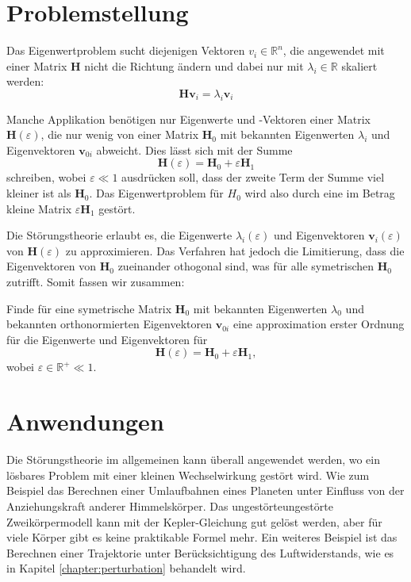 %
%
\section{Problemstellung
\label{ew:section:problemstellung}}

Das Eigenwertproblem sucht diejenigen Vektoren $v_i \in \mathbb{R}^{n} $, die angewendet mit einer Matrix $\bm H$ nicht die Richtung ändern und dabei nur mit $\lambda_i \in \mathbb{R}$ skaliert werden:
\begin{equation}
    \bm H \bm v_i = \lambda_i \bm v_i \label{ew:eq:eig}
\end{equation}

Manche Applikation benötigen nur Eigenwerte und -Vektoren einer Matrix $\bm H(\varepsilon)$, die nur wenig von einer Matrix $\bm H_0$ mit bekannten Eigenwerten $\lambda_{i}$ und Eigenvektoren $\bm v_{0i}$ abweicht.
Dies lässt sich mit der Summe
\begin{equation}
    \bm H(\varepsilon) = \bm H_0 + \varepsilon \bm H_1
\end{equation}
schreiben, wobei $\varepsilon \ll 1 $ ausdrücken soll, dass der zweite Term der Summe viel kleiner ist als $\bm H_0$.
Das Eigenwertproblem für $H_0$ wird also durch eine im Betrag kleine Matrix $ \varepsilon \bm H_1$ gestört.

Die Störungstheorie erlaubt es, die Eigenwerte $\lambda_i(\varepsilon)$ und Eigenvektoren  $\bm v_i(\varepsilon)$ von $\bm H(\varepsilon)$ zu approximieren.
Das Verfahren hat jedoch die Limitierung, dass die Eigenvektoren von $\bm H_0$ zueinander othogonal sind, was für alle symetrischen $\bm H_0$ zutrifft.
Somit fassen wir zusammen:
\begin{aufgabe}
Finde für eine symetrische Matrix $\bm H_0$ mit bekannten Eigenwerten $\lambda_{0}$ und bekannten orthonormierten Eigenvektoren $\bm v_{0i}$ eine approximation erster Ordnung für die Eigenwerte und Eigenvektoren für
\begin{equation*}
    \bm H(\varepsilon) = \bm H_0 + \varepsilon \bm H_1,
\end{equation*}
wobei $\varepsilon \in \mathbb{R^+} \ll 1$.
\end{aufgabe}

\section{Anwendungen}

Die Störungstheorie im allgemeinen kann überall angewendet werden, wo ein lösbares Problem mit einer kleinen Wechselwirkung gestört wird.
Wie zum Beispiel das Berechnen einer Umlaufbahnen eines Planeten unter Einfluss von der Anziehungskraft anderer Himmelskörper.
Das ungestörteungestörte Zweikörpermodell kann mit der Kepler-Gleichung gut gelöst werden, aber für viele Körper gibt es keine praktikable Formel mehr.
Ein weiteres Beispiel ist das Berechnen einer Trajektorie unter Berücksichtigung des Luftwiderstands, wie es in Kapitel \ref{chapter:perturbation} behandelt wird.

